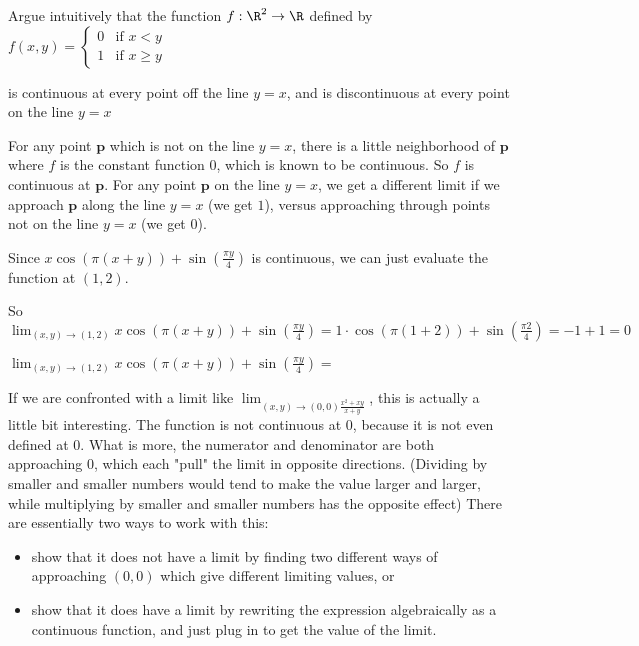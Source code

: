 \documentclass{ximera}
\begin{document}
		Argue intuitively that the function $f:\R^2 \to \R$ defined by 
			$f(x,y) = \begin{cases}
			0 & \text{if $x<y$}\\
			1 & \text{if $x\geq y$}
			\end{cases}$
			
			is continuous at every point off the line $y=x$, and is discontinuous at every point on the line $y=x$
\begin{free-response}
	For any point $\mathbf{p}$ which is not on the line $y=x$, there is a little neighborhood of $\mathbf{p}$ where $f$ is the constant function $0$,
	 which is known to be  continuous.  So $f$ is continuous at $\mathbf{p}$.  For any point $\mathbf{p}$ on the line $y=x$, we get a different limit if we approach 
	 $\mathbf{p}$ along the line $y=x$ (we get $1$), versus approaching through points not on the line $y=x$ (we get $0$).
\end{free-response}
	
	\begin{question}
		\begin{solution}
		\begin{hint}
			Since $x\cos(\pi (x+y)) + \sin(\frac{\pi y}{4})$ is continuous, we can just evaluate the function at $(1,2)$.
		\end{hint}
		\begin{hint}
			So $\lim_{(x,y) \to (1,2)} x\cos(\pi (x+y)) + \sin(\frac{\pi y}{4}) = 1 \cdot \cos(\pi(1+2))+\sin(\frac{\pi 2}{4}) = -1+1=0$
		\end{hint}
		$\lim_{(x,y) \to (1,2)} x\cos(\pi (x+y)) + \sin(\frac{\pi y}{4}) =$ 
		\end{solution}
	\end{question}
	
	If we are confronted with a limit like $\lim_{(x,y) \to (0,0) \frac{x^2+xy}{x+y}}$, this is actually a little bit interesting.  The function is not continuous at $0$, because it is
	not even defined at $0$.  What is more, the numerator and denominator are both approaching $0$, which each "pull" the limit in opposite directions. 
	(Dividing by smaller and smaller numbers would tend to make the value larger and larger, while multiplying by smaller and smaller numbers has the opposite effect)
	  There are essentially two ways to work with this: 
          \begin{itemize}
\item show that it does not have a limit by finding two different ways of approaching $(0,0)$ which give different limiting values, or
\item show that it does have a limit by rewriting the expression algebraically as a continuous function, and just plug in to get the value of the limit.
          \end{itemize}
\end{document}
